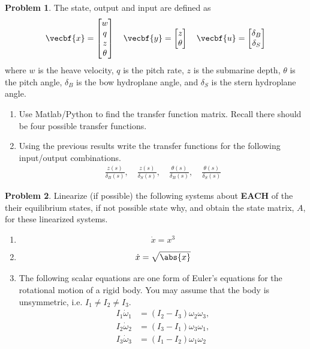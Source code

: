 \documentclass[10pt]{article}
\theoremstyle{definition}
\newtheorem{prob}{Problem}[section]
\newenvironment{subprob}%
{\renewcommand{\theenumi}{\alph{enumi}}\renewcommand{\labelenumi}{(\theenumi)}\begin{enumerate}}%
{\end{enumerate}}%
\begin{document}
\begin{prob}
    The state, output and input are defined as
    \begin{align*}
        \vecbf{x} = \begin{bmatrix}
            w \\ q \\ z \\ \theta
        \end{bmatrix}
        \quad
        \vecbf{y} = \begin{bmatrix} z \\ \theta \end{bmatrix} \quad \vecbf{u} = \begin{bmatrix} \delta_B \\ \delta_S \end{bmatrix}
    \end{align*}
    where \( w\) is the heave velocity, \( q \) is the pitch rate, \( z \) is the submarine depth, \( \theta\) is the pitch angle, \( \delta_B\) is the bow hydroplane angle, and \( \delta_S\) is the stern hydroplane angle.

    \begin{subprob}
        \item Use Matlab/Python to find the transfer function matrix. 
            Recall there should be four possible transfer functions.
        \item Using the previous results write the transfer functions for the following input/output combinations.
            \begin{align*}
                \frac{z(s)}{\delta_B(s)} ,\quad \frac{z(s)}{\delta_S(s)} ,\quad \frac{\theta(s)}{\delta_B(s)} ,\quad \frac{\theta(s)}{\delta_S(s)}
            \end{align*}
    \end{subprob}
\end{prob}

\begin{prob}
    Linearize (if possible) the following systems about \textbf{EACH} of the their equilibrium states, if not possible state why, and obtain the state matrix, \( A \), for these linearized systems.

    \begin{subprob}
        \item \[ \dot x = x^3\]
        \item \[ \dot x = \sqrt{ \abs{x}} \]
        \item The following scalar equations are one form of Euler's equations for the rotational motion of a rigid body. 
            You may assume that the body is unsymmetric, i.e. \( I_1 \neq I_2 \neq I_3\).
            \begin{align*}
                I_1 \dot \omega_1 &= (I_2 - I_3) \omega_2 \omega_3 , \\
                I_2 \dot \omega_2 &= (I_3 - I_1) \omega_3 \omega_1 , \\
                I_3 \dot \omega_3 &= (I_1 - I_2) \omega_1 \omega_2  \\
            \end{align*}
    \end{subprob}
\end{prob}
\end{document}
